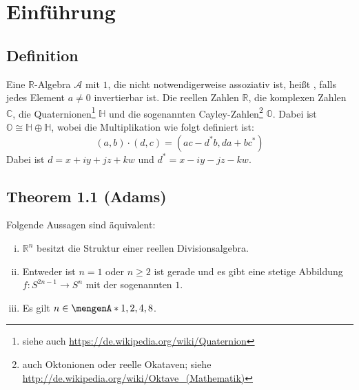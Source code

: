 
\newcommand{\fach}{$K$-Theorie und die Hopf-Invariante}
\newcommand{\semester}{SoSe 2015}
\newcommand{\homepage}{https://wwwmath.uni-muenster.de/reine/u/topos/lehre/SS2015/KTheorie-Hopf/Hopf.html}

\newcommand{\prof}{Dr.\ Ulrich Penning}
\publishers{\scalebox{14}{$K$}}



\maketitle
\begin{abstract}

\end{abstract}

\tableofcontents
\cleardoubleoddemptypage

\setcounter{page}{1}

\setcounter{section}{-1}
\section{Einführung} %
\label{sec:0}

\subsection[Definition: Reelle Divisionsalgebra]{Definition} %
\label{sub:01}
Eine $\mathds{R}$-Algebra $\mathcal{A}$ mit $1$, die nicht notwendigerweise assoziativ ist, heißt , falls jedes Element $a\not= 0$ invertierbar 
ist.
Die reellen Zahlen $\mathds{R}$, die komplexen Zahlen $\mathds{C}$, die Quaternionen\footnote{siehe auch \url{https://de.wikipedia.org/wiki/Quaternion}} $\mathds{H}$ und die sogenannten Cayley-Zahlen\footnote{auch Oktonionen oder reelle Okataven; siehe  \url{http://de.wikipedia.org/wiki/Oktave_(Mathematik)}} $\mathds{O}$. Dabei ist
$\mathds{O} \cong \mathds{H} \oplus \mathds{H}$, wobei die Multiplikation wie folgt definiert ist:
\[
	(a,b) \cdot (d,c) = (ac - d^* b, da + bc^*) 
\]
Dabei ist $d= x + iy + jz + kw$ und $d^* = x -iy -jz - kw$.

\subsection{Theorem 1.1 (Adams)} %
\label{sub:02}
Folgende Aussagen sind äquivalent:
\begin{enumerate}[(i)]
	\item $\mathds{R}^n$ besitzt die Struktur einer reellen Divisionsalgebra.
	\item Entweder ist $n=1$ oder $n \ge 2$ ist gerade und es gibt eine stetige Abbildung $f \colon S^{2n-1} \to S^n$ mit der sogenannten  $1$.
	\item Es gilt $n \in \set{1,2,4,8}$.
\end{enumerate}

